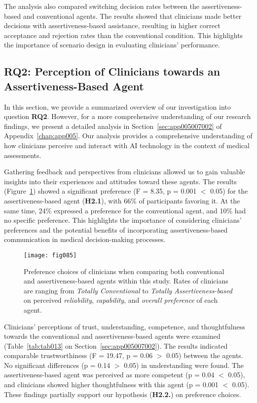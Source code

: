 The analysis also compared switching decision rates between the assertiveness-based and conventional agents.
The results showed that clinicians made better decisions with assertiveness-based assistance, resulting in higher correct acceptance and rejection rates than the conventional condition.
This highlights the importance of scenario design in evaluating clinicians' performance.

\subsection{RQ2: Perception of Clinicians towards an Assertiveness-Based Agent}
\label{sec:chap006006002}

In this section, we provide a summarized overview of our investigation into question {\bf RQ2}.
However, for a more comprehensive understanding of our research findings, we present a detailed analysis in Section~\ref{sec:app005007002} of Appendix~\ref{chap:app005}.
Our analysis provides a comprehensive understanding of how clinicians perceive and interact with \ac{AI} technology in the context of medical assessments.

Gathering feedback and perspectives from clinicians allowed us to gain valuable insights into their experiences and attitudes toward these agents.
The results (Figure~\ref{fig:fig085}) showed a significant preference (F = 8.35, p = 0.001 $<$ 0.05) for the assertiveness-based agent ({\bf H2.1}), with 66\% of participants favoring it.
At the same time, 24\% expressed a preference for the conventional agent, and 10\% had no specific preference.
This highlights the importance of considering clinicians' preferences and the potential benefits of incorporating assertiveness-based communication in medical decision-making processes.

\begin{figure}[htpb]
\centering
\texttt{[image: fig085]}
\caption[]{Preference choices of clinicians when comparing both conventional and assertiveness-based agents within this study. Rates of clinicians are ranging from {\it Totally Conventional} to {\it Totally Assertiveness-based} on perceived {\it reliability}, {\it capability}, and {\it overall preference} of each agent.}
\label{fig:fig085}
\end{figure}

Clinicians' perceptions of trust, understanding, competence, and thoughtfulness towards the conventional and assertiveness-based agents were examined (Table~\ref{tab:tab013} on Section~\ref{sec:app005007002}).
The results indicated comparable trustworthiness (F = 19.47, p = 0.06 $>$ 0.05) between the agents.
No significant differences (p = 0.14 $>$ 0.05) in understanding were found.
The assertiveness-based agent was perceived as more competent (p = 0.04 $<$ 0.05), and clinicians showed higher thoughtfulness with this agent (p = 0.001 $<$ 0.05).
These findings partially support our hypothesis ({\bf H2.2.}) on preference choices.

